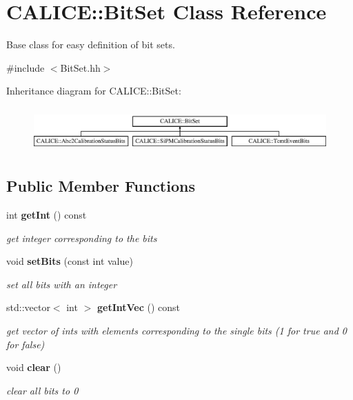 \section{C\-A\-L\-I\-C\-E\-:\-:Bit\-Set Class Reference}
\label{classCALICE_1_1BitSet}


Base class for easy definition of bit sets.  




{\ttfamily \#include $<$Bit\-Set.\-hh$>$}

Inheritance diagram for C\-A\-L\-I\-C\-E\-:\-:Bit\-Set\-:\begin{figure}[H]
\begin{center}
\leavevmode
\includegraphics[height=1.728395cm]{classCALICE_1_1BitSet}
\end{center}
\end{figure}
\subsection*{Public Member Functions}
\begin{DoxyCompactItemize}
\item 
int {\bf get\-Int} () const 
\begin{DoxyCompactList}\small\item\em get integer corresponding to the bits \end{DoxyCompactList}\item 
void {\bf set\-Bits} (const int value)
\begin{DoxyCompactList}\small\item\em set all bits with an integer \end{DoxyCompactList}\item 
std\-::vector$<$ int $>$ {\bf get\-Int\-Vec} () const 
\begin{DoxyCompactList}\small\item\em get vector of ints with elements corresponding to the single bits (1 for true and 0 for false) \end{DoxyCompactList}\item 
void {\bf clear} ()\label{classCALICE_1_1BitSet_abd6be6d671e597c9c04afd73d25f7b6a}

\begin{DoxyCompactList}\small\item\em clear all bits to 0 \end{DoxyCompactList}\end{DoxyCompactItemize}
